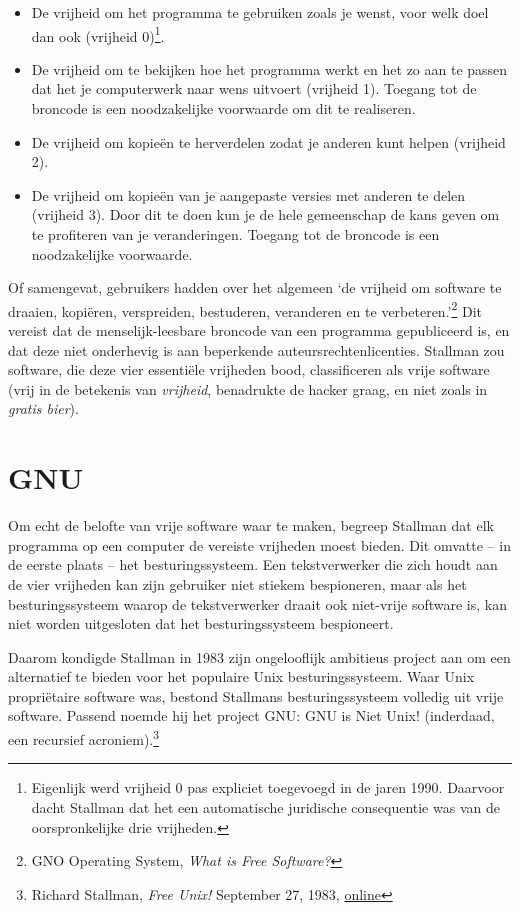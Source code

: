 \documentclass[
  a5paper,
  smalldemyvopaper,11pt,twoside,onecolumn,openright,extrafontsizes,
hidelinks]{memoir}
\begin{document}
\begin{itemize}
\item
  De vrijheid om het programma te gebruiken zoals je wenst, voor welk
  doel dan ook (vrijheid 0)\footnote{Eigenlijk werd vrijheid 0 pas
    expliciet toegevoegd in de jaren 1990. Daarvoor dacht Stallman dat
    het een automatische juridische consequentie was van de
    oorspronkelijke drie vrijheden.}.
\item
  De vrijheid om te bekijken hoe het programma werkt en het zo aan te
  passen dat het je computerwerk naar wens uitvoert (vrijheid 1).
  Toegang tot de broncode is een noodzakelijke voorwaarde om dit te
  realiseren.
\item
  De vrijheid om kopieën te herverdelen zodat je anderen kunt helpen
  (vrijheid 2).
\item
  De vrijheid om kopieën van je aangepaste versies met anderen te delen
  (vrijheid 3). Door dit te doen kun je de hele gemeenschap de kans
  geven om te profiteren van je veranderingen. Toegang tot de broncode
  is een noodzakelijke voorwaarde.
\end{itemize}

Of samengevat, gebruikers hadden over het algemeen `de vrijheid om
software te draaien, kopiëren, verspreiden, bestuderen, veranderen en te
verbeteren.'\footnote{\hspace{0pt}GNO Operating System, \emph{What is
  Free Software?}} Dit vereist dat de menselijk-leesbare broncode van
een programma gepubliceerd is, en dat deze niet onderhevig is aan
beperkende auteursrechtenlicenties. Stallman zou software, die deze vier
essentiële vrijheden bood, classificeren als vrije software (vrij in de
betekenis van \emph{vrijheid}, benadrukte de hacker graag, en niet zoals
in \emph{gratis bier}).

\section{GNU}\label{gnu}

Om echt de belofte van vrije software waar te maken, begreep Stallman
dat elk programma op een computer de vereiste vrijheden moest bieden.
Dit omvatte -- in de eerste plaats -- het besturingssysteem. Een
tekstverwerker die zich houdt aan de vier vrijheden kan zijn gebruiker
niet stiekem bespioneren, maar als het besturingssysteem waarop de
tekstverwerker draait ook niet-vrije software is, kan niet worden
uitgesloten dat het besturingssysteem bespioneert.

Daarom kondigde Stallman in 1983 zijn ongelooflijk ambitieus project aan
om een alternatief te bieden voor het populaire Unix besturingssysteem.
Waar Unix propriëtaire software was, bestond Stallmans besturingssysteem
volledig uit vrije software. Passend noemde hij het project GNU: GNU is
Niet Unix! (inderdaad, een recursief acroniem).\footnote{\hspace{0pt}Richard
  Stallman, \emph{Free Unix!} September 27, 1983,
  \href{https://www.gnu.org/gnu/initial-announcement.en.html.}{online}}
\end{document}
